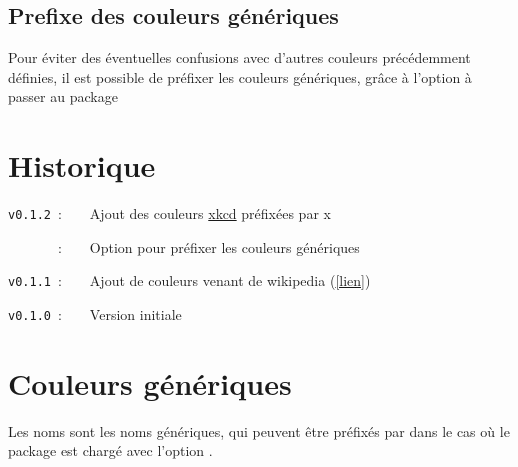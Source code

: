 \documentclass[french,11pt,a4paper]{article}
\begin{document}

\subsection{Prefixe des couleurs génériques}

Pour éviter des éventuelles confusions avec d'autres couleurs précédemment définies, il est possible de préfixer les couleurs génériques, grâce à l'option \MontreCode{[Prefixe]} à passer au package 


\vfill

\section{Historique}

\verb|v0.1.2|~:~~~~Ajout des couleurs \href{https://xkcd.com/color/rgb.txt}{xkcd} préfixées par x

\verb|      |~:~~~~Option pour préfixer les couleurs génériques

\verb|v0.1.1|~:~~~~Ajout de couleurs venant de wikipedia (\href{https://fr.wikipedia.org/wiki/Liste_de_noms_de_couleur}{[lien]})

\verb|v0.1.0|~:~~~~Version initiale

\vspace*{15mm}

\pagebreak

\section{Couleurs génériques}

Les noms sont les noms génériques, qui peuvent être préfixés par  dans le cas où le package est chargé avec l'option \MontreCode{[Prefixe]}.
%
\end{document}
